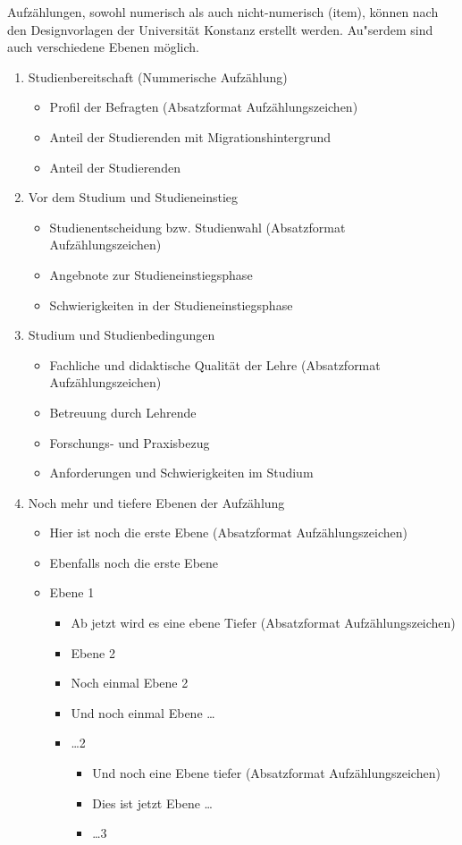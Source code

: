 \documentclass[../thesis.tex]{subfiles}
\begin{document}
Aufzählungen, sowohl numerisch als auch nicht-numerisch (item), können nach den Designvorlagen der Universität Konstanz erstellt werden. Au"serdem sind auch verschiedene Ebenen möglich.\\

\begin{enumerate}
\item Studienbereitschaft (Nummerische Aufzählung)

\begin{itemize}
\item Profil der Befragten (Absatzformat Aufzählungszeichen)
\item Anteil der Studierenden mit Migrationshintergrund
\item Anteil der Studierenden
\end{itemize}

\item Vor dem Studium und Studieneinstieg
\begin{itemize}
\item Studienentscheidung bzw. Studienwahl (Absatzformat Aufzählungszeichen)
\item Angebnote zur Studieneinstiegsphase
\item Schwierigkeiten in der Studieneinstiegsphase
\end{itemize}

\item Studium und Studienbedingungen
\begin{itemize}
\item Fachliche und didaktische Qualität der Lehre (Absatzformat Aufzählungszeichen)
\item Betreuung durch Lehrende
\item Forschungs- und Praxisbezug
\item Anforderungen und Schwierigkeiten im Studium
\end{itemize}

\item Noch mehr und tiefere Ebenen der Aufzählung

\begin{itemize}
\item Hier ist noch die erste Ebene (Absatzformat Aufzählungszeichen)
\item Ebenfalls noch die erste Ebene
\item Ebene 1
\begin{itemize}
\item Ab jetzt wird es eine ebene Tiefer (Absatzformat Aufzählungszeichen)
\item Ebene 2
\item Noch einmal Ebene 2
\item Und noch einmal Ebene \ldots
\item \ldots 2
\begin{itemize}
\item Und noch eine Ebene tiefer (Absatzformat Aufzählungszeichen)
\item Dies ist jetzt Ebene \ldots
\item \ldots 3
\end{itemize}
\end{itemize}
\end{itemize}


\end{enumerate}
\end{document}
